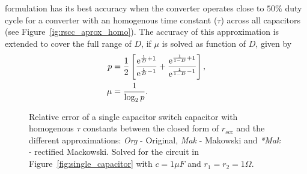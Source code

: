 \citeauthor{2012Makowski} formulation has its best accuracy when the converter operates close to $50\%$ duty cycle for a converter with an homogenous time constant ($\tau$) across all capacitors (see Figure~\ref{ig:rscc_aprox_homo}). The accuracy of this approximation is extended to cover the full range of $D$, if $\mu$ is solved as function of $D$, given by
\begin{align}
p & = \frac{1}{2} \left[ \frac{\mathrm{e}^{\frac{1}{D}+1}}{\mathrm{e}^{\frac{1}{D}-1}} + \frac{\mathrm{e}^{\frac{1}{1-D}+1}}{\mathrm{e}^{\frac{1}{1-D}-1}} \right],\\
\mu &= \frac{1}{\log_2 p}.
\label{eq:u_factor}
\end{align}

\begin{figure}[!h]
\newcommand\pHeigh{3.25cm}
\newcommand\pWidth{4.5cm}
\centering
    \begin{subfigure}{\textwidth}
       \parbox[b]{.45\linewidth}{
            \raggedright
            \newcommand\dutyCycle{10}
            \newcommand\uDx{1.74}
            
        }
       \parbox[b]{.45\linewidth}{
            \raggedleft
            \newcommand\dutyCycle{23}
            \newcommand\uDx{2.12}
            
        }
    \end{subfigure}

    \begin{subfigure}{\textwidth}
       \parbox[b]{.45\linewidth}{
            \raggedright
            \newcommand\dutyCycle{36}
            \newcommand\uDx{2.43}
            
        }
       \parbox[b]{.45\linewidth}{
            \raggedleft
            \newcommand\dutyCycle{50}
            \newcommand\uDx{2.54}
            
        }
    \end{subfigure}


\caption[Different approximations methods for $r_{scc}$ scenario I]{Relative error of a single capacitor switch capacitor with homogenous $\tau$ constants  between the closed form of $r_{scc}$ and the different approximations: \emph{Org} - Original, \emph{Mak} - Makowski and \emph{*Mak} - rectified Mackowski.  Solved for the circuit in Figure~\ref{fig:single_capacitor} with $c=1\mu F$ and $r_1=r_2=1\Omega$.}
\label{fig:rscc_aprox_homo}
\end{figure}

